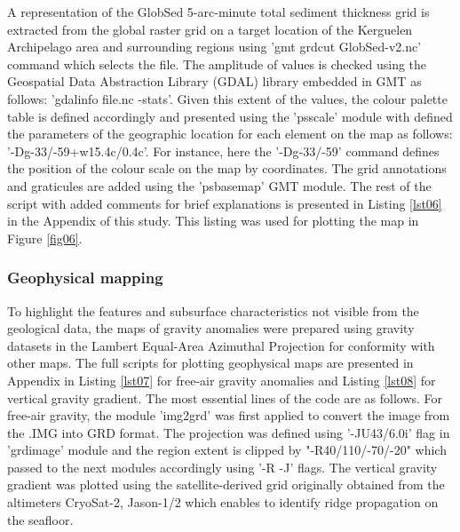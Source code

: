 \documentclass[geomatics,article,submit,pdftex,moreauthors]{Definitions/mdpi}
\begin{document}
A representation of the GlobSed 5-arc-minute total sediment thickness grid is extracted from the global raster grid on a target location of the Kerguelen Archipelago area and surrounding regions using 'gmt grdcut GlobSed-v2.nc' command which selects the file. The amplitude of values is checked using the Geospatial Data Abstraction Library (GDAL) library embedded in GMT as follows: 'gdalinfo file.nc -stats'. Given this extent of the values, the colour palette table is defined accordingly and presented using the 'psscale' module with defined the parameters of the geographic location for each element on the map as follows: '-Dg-33/-59+w15.4c/0.4c'. For instance, here the '-Dg-33/-59' command defines the position of the colour scale on the map by coordinates. The grid annotations and graticules are added using the 'psbasemap' GMT module. The rest of the script with added comments for brief explanations is presented in Listing \ref{lst06} in the Appendix of this study. This listing was used for plotting the map in Figure \ref{fig06}. 

\subsubsection{Geophysical mapping}

To highlight the features and subsurface characteristics not visible from the geological data, the maps of gravity anomalies were prepared using gravity datasets in the Lambert Equal-Area Azimuthal Projection for conformity with other maps. The full scripts for plotting geophysical maps are presented in Appendix in Listing \ref{lst07} for free-air gravity anomalies and Listing \ref{lst08} for vertical gravity gradient. The most essential lines of the code are as follows. For free-air gravity, the module 'img2grd' was first applied to convert the image from the .IMG into GRD format. The projection was defined using '-JU43/6.0i' flag in 'grdimage' module and the region extent is clipped by "-R40/110/-70/-20" which passed to the next modules accordingly using '-R -J' flags. The vertical gravity gradient was plotted using the satellite-derived grid originally obtained from the altimeters CryoSat-2, Jason-1/2 \cite{Harper} which enables to identify ridge propagation on the seafloor.
\end{document}
